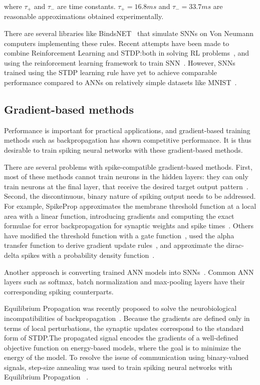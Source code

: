 \documentclass[fyp]{socreport}
\begin{document}
where \(\tau_{+}\) and \(\tau_{-}\) are time constants. \(\tau_{+} = 16.8ms\)
and \(\tau_{-} = 33.7ms\) are reasonable approximations obtained experimentally.

There are several libraries like BindsNET~\cite{10.3389/fninf.2018.00089} that
simulate SNNs on Von Neumann computers implementing these rules. Recent attempts
have been made to combine Reinforcement Learning and STDP:\@ both in solving RL
problems~\cite{10.3389/fninf.2018.00089}, and using the reinforcement learning
framework to train
SNN~\cite{10.3389/fnbot.2019.00018,10.3389/fnins.2018.00435}. However, SNNs
trained using the STDP learning rule have yet to achieve comparable performance
compared to ANNs on relatively simple datasets like MNIST~\cite{TAVANAEI201947}.

\subsection{Gradient-based methods}

Performance is important for practical applications, and gradient-based training
methods such as backpropagation has shown competitive performance. It is thus
desirable to train spiking neural networks with these gradient-based methods.

There are several problems with spike-compatible gradient-based methods. First,
most of these methods cannot train neurons in the hidden layers: they can only
train neurons at the final layer, that receive the desired target output
pattern~\cite{urbanczik09_gradien_learn_rule_tempot,training_deep_snn_bpp_lee}.
Second, the discontinuous, binary nature of spiking output needs to be
addressed. For example, SpikeProp approximates the membrane threshold function
at a local area with a linear function, introducing gradients and computing the
exact formulae for error backpropagation for synaptic weights and spike
times~\cite{spikeprop}. Others have modified the threshold function with a gate
function~\cite{NIPS2018_7417}, used the alpha transfer function to derive
gradient update rules~\cite{comsa19_tempor_codin_spikin_neural_networ}, and
approximate the dirac-delta spikes with a probability density
function~\cite{NIPS2018_7415}.

Another approach is converting trained ANN models into
SNNs~\cite{rueckauer16_theor_tools_conver_analog_to}. Common ANN layers such as
softmax, batch normalization and max-pooling layers have their corresponding
spiking counterparts.

Equilibrium Propagation was recently proposed to solve the neurobiological
incompatibilities of backpropagation~\cite{10.3389/fncom.2017.00024}. Because
the gradients are defined only in terms of local perturbations, the synaptic
updates correspond to the standard form of STDP.\@ The propagated signal encodes
the gradients of a well-defined objective function on energy-based models, where
the goal is to minimize the energy of the model. To resolve the issue of
communication using binary-valued signals, step-size annealing was used to train
spiking neural networks with Equilibrium Propagation
~\cite{pmlr-v89-o-connor19a}.
\end{document}
